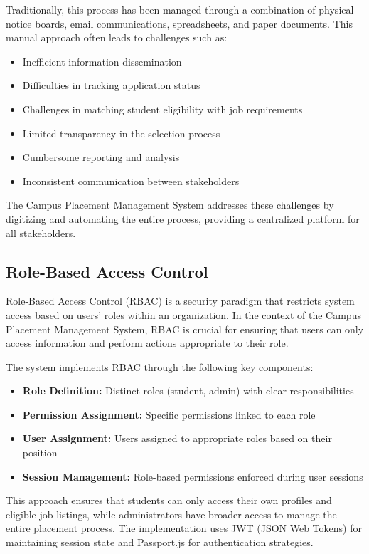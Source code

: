 \documentclass[12pt,a4paper]{report}
\begin{document}
Traditionally, this process has been managed through a combination of physical notice boards, email communications, spreadsheets, and paper documents. This manual approach often leads to challenges such as:

\begin{itemize}
    \item Inefficient information dissemination
    \item Difficulties in tracking application status
    \item Challenges in matching student eligibility with job requirements
    \item Limited transparency in the selection process
    \item Cumbersome reporting and analysis
    \item Inconsistent communication between stakeholders
\end{itemize}

The Campus Placement Management System addresses these challenges by digitizing and automating the entire process, providing a centralized platform for all stakeholders.

\subsection{Role-Based Access Control}
Role-Based Access Control (RBAC) is a security paradigm that restricts system access based on users' roles within an organization. In the context of the Campus Placement Management System, RBAC is crucial for ensuring that users can only access information and perform actions appropriate to their role.

The system implements RBAC through the following key components:

\begin{itemize}
    \item \textbf{Role Definition:} Distinct roles (student, admin) with clear responsibilities
    \item \textbf{Permission Assignment:} Specific permissions linked to each role
    \item \textbf{User Assignment:} Users assigned to appropriate roles based on their position
    \item \textbf{Session Management:} Role-based permissions enforced during user sessions
\end{itemize}

This approach ensures that students can only access their own profiles and eligible job listings, while administrators have broader access to manage the entire placement process. The implementation uses JWT (JSON Web Tokens) for maintaining session state and Passport.js for authentication strategies.
\end{document}
